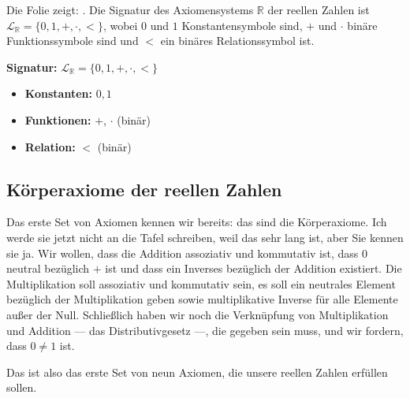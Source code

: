 \begin{meta-note}
Die Folie zeigt: . Die Signatur des Axiomensystems $\mathbb{R}$ der reellen Zahlen ist $\mathcal{L}_{\mathbb{R}} = \{0, 1, +, \cdot, <\}$, wobei $0$ und $1$ Konstantensymbole sind, $+$ und $\cdot$ binäre Funktionssymbole sind und $<$ ein binäres Relationssymbol ist.
\end{meta-note}

\begin{math-stroke}
\textbf{Signatur:} $\mathcal{L}_{\mathbb{R}} = \{0, 1, +, \cdot, <\}$
\begin{itemize}
    \item \textbf{Konstanten:} $0, 1$
    \item \textbf{Funktionen:} $+$, $\cdot$ (binär)
    \item \textbf{Relation:} $<$ (binär)
\end{itemize}
\end{math-stroke}

\subsection{Körperaxiome der reellen Zahlen}
\begin{spoken-clean}[00:14:40 - 00:15:56]
Das erste Set von Axiomen kennen wir bereits: das sind die Körperaxiome. Ich werde sie jetzt nicht an die Tafel schreiben, weil das sehr lang ist, aber Sie kennen sie ja. Wir wollen, dass die Addition assoziativ und kommutativ ist, dass $0$ neutral bezüglich $+$ ist und dass ein Inverses bezüglich der Addition existiert. Die Multiplikation soll assoziativ und kommutativ sein, es soll ein neutrales Element bezüglich der Multiplikation geben sowie multiplikative Inverse für alle Elemente außer der Null. Schließlich haben wir noch die Verknüpfung von Multiplikation und Addition --- das Distributivgesetz ---, die gegeben sein muss, und wir fordern, dass $0 \neq 1$ ist.

Das ist also das erste Set von neun Axiomen, die unsere reellen Zahlen erfüllen sollen.
\end{spoken-clean}


